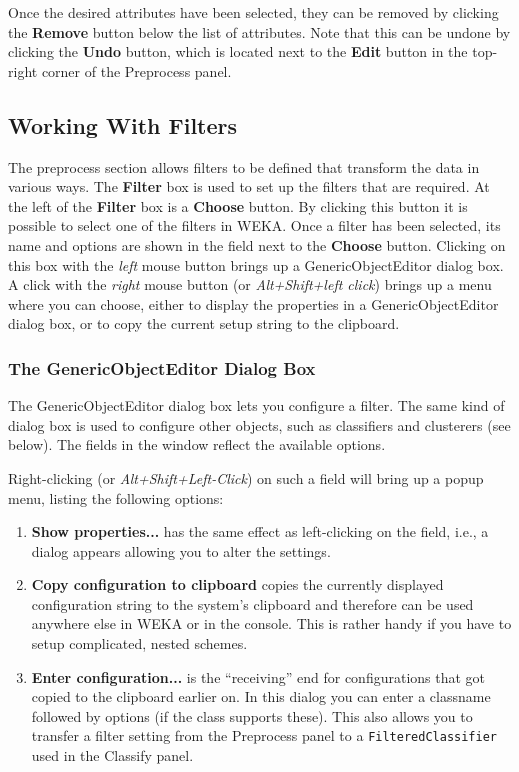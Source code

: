 Once the desired attributes have been selected, they can be removed by
clicking the \textbf{Remove} button below the list of attributes.
Note that this can be undone by clicking the \textbf{Undo} button,
which is located next to the \textbf{Edit} button in the top-right
corner of the Preprocess panel.

\subsection{Working With Filters}

\begin{center}
\end{center}

The preprocess section allows filters to be defined that transform the
data in various ways.  The \textbf{Filter} box is used to set up the
filters that are required.  At the left of the \textbf{Filter} box is
a \textbf{Choose} button. By clicking this button it is possible to
select one of the filters in WEKA. Once a filter has been selected,
its name and options are shown in the field next to the
\textbf{Choose} button. Clicking on this box with the \textit{left} mouse button
brings up a GenericObjectEditor dialog box. A click with the \textit{right}
mouse button (or \textit{Alt+Shift+left click}) brings up a menu where you can
choose, either to display the properties in a GenericObjectEditor dialog
box, or to copy the current setup string to the clipboard.

\subsubsection*{The GenericObjectEditor Dialog Box}

The GenericObjectEditor dialog box lets you configure a filter. The
same kind of dialog box is used to configure other objects, such as
classifiers and clusterers (see below). The fields in the window
reflect the available options.

Right-clicking (or \textit{Alt+Shift+Left-Click}) on such a field 
will bring up a popup menu, listing the following options:
\begin{enumerate}
  \item \textbf{Show properties...} has the same effect as left-clicking
  on the field, i.e., a dialog appears allowing you to alter the settings.
  \item \textbf{Copy configuration to clipboard} copies the currently
  displayed configuration string to the system's clipboard and therefore 
  can be used anywhere else in WEKA or in the console. This is rather handy
  if you have to setup complicated, nested schemes.
  \item \textbf{Enter configuration...} is the ``receiving'' end for
  configurations that got copied to the clipboard earlier on. In this dialog you
  can enter a classname followed by options (if the class supports these).
  This also allows you to transfer a filter setting from the Preprocess
  panel to a \texttt{FilteredClassifier} used in the Classify panel.
\end{enumerate}

